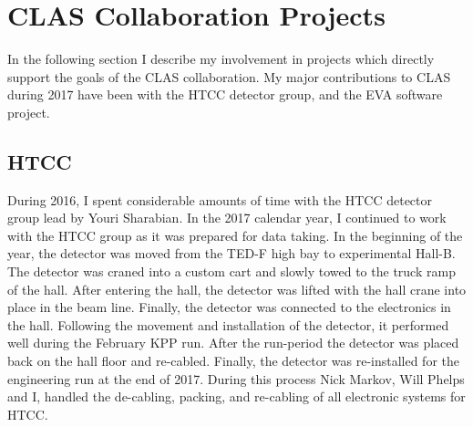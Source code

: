 %
%
\section{CLAS Collaboration Projects}
In the following section I describe my involvement in projects which directly support the goals of the CLAS collaboration.  My major contributions to CLAS during 2017 have been with the HTCC detector group, and the EVA software project.  

\subsection{HTCC}
During 2016, I spent considerable amounts of time with the HTCC detector group lead by Youri Sharabian.  In the 2017 calendar year, I continued to work with the HTCC group as it was prepared for data taking.  In the beginning of the year, the detector was moved from the TED-F high bay to experimental Hall-B.  The detector was craned into a custom cart and slowly towed to the truck ramp of the hall.  After entering the hall, the detector was lifted with the hall crane into place in the beam line.  Finally, the detector was connected to the electronics in the hall.  Following the movement and installation of the detector, it performed well during the February KPP run.  After the run-period the detector was placed back on the hall floor and re-cabled.  Finally, the detector was re-installed for the engineering run at the end of 2017.  During this process Nick Markov, Will Phelps and I, handled the de-cabling, packing, and re-cabling of all electronic systems for HTCC.  

